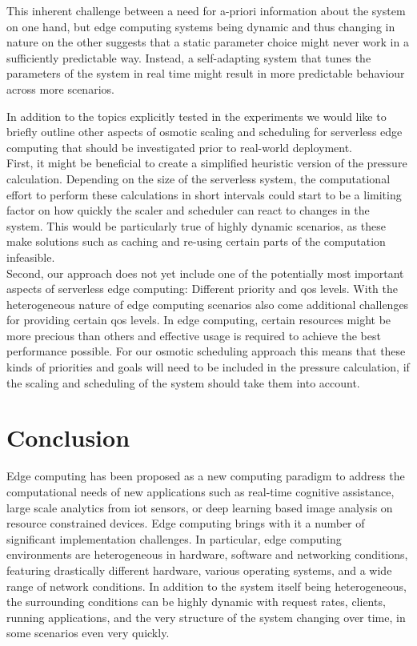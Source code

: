 \documentclass[draft,final]{vutinfth} %
\begin{document}
This inherent challenge between a need for a-priori information about the system on one hand, but edge computing systems being dynamic and thus changing in nature on the other suggests that a static parameter choice might never work in a sufficiently predictable way.
Instead, a self-adapting system that tunes the parameters of the system in real time might result in more predictable behaviour across more scenarios.

In addition to the topics explicitly tested in the experiments we would like to briefly outline other aspects of osmotic scaling and scheduling for serverless edge computing that should be investigated prior to real-world deployment.\\
First, it might be beneficial to create a simplified heuristic version of the pressure calculation. Depending on the size of the serverless system, the computational effort to perform these calculations in short intervals could start to be a limiting factor on how quickly the scaler and scheduler can react to changes in the system.
This would be particularly true of highly dynamic scenarios, as these make solutions such as caching and re-using certain parts of the computation infeasible.\\
Second, our approach does not yet include one of the potentially most important aspects of serverless edge computing: Different priority and \gls{qos} levels.
With the heterogeneous nature of edge computing scenarios also come additional challenges for providing certain \gls{qos} levels.
In edge computing, certain resources might be more precious than others and effective usage is required to achieve the best performance possible.
For our osmotic scheduling approach this means that these kinds of priorities and goals will need to be included in the pressure calculation, if the scaling and scheduling of the system should take them into account.


\chapter{Conclusion}
Edge computing has been proposed as a new computing paradigm to address the computational needs of new applications such as real-time cognitive assistance, large scale analytics from \gls{iot} sensors, or deep learning based image analysis on resource constrained devices.
Edge computing brings with it a number of significant implementation challenges.
In particular, edge computing environments are heterogeneous in hardware, software and networking conditions, featuring drastically different hardware, various operating systems, and a wide range of network conditions.
In addition to the system itself being heterogeneous, the surrounding conditions can be highly dynamic with request rates, clients, running applications, and the very structure of the system changing over time, in some scenarios even very quickly.
\end{document}
